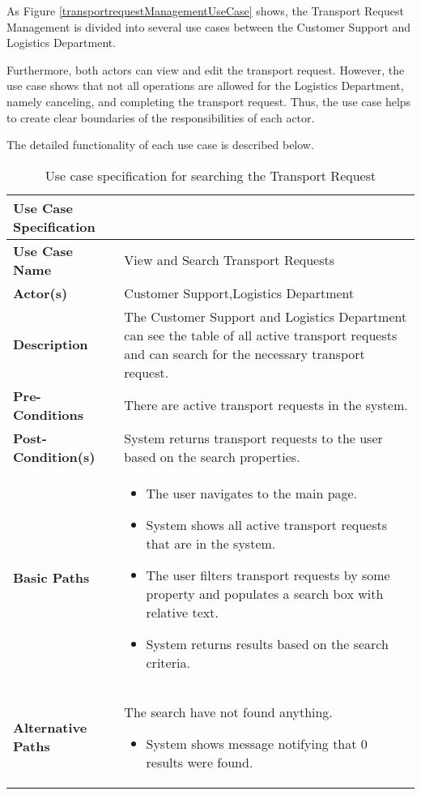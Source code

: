 \documentclass[a4paper]{article}
\begin{document}
    As Figure \ref{transportrequestManagementUseCase} shows, the Transport Request Management is divided into several use cases between the Customer Support and Logistics Department. 
    
    Furthermore, both actors can view and edit the transport request. However, the use case shows that not all operations are allowed for the Logistics Department, namely canceling, and completing the transport request. Thus, the use case helps to create clear boundaries of the responsibilities of each actor.
 
    The detailed functionality of each use case is described below.

    \begin{longtable}{|p{}|p{}|}
          \caption{Use case specification for searching the Transport Request}
        \label{transportRequestSearchingUseCase} \\
        \hline
        Use Case Specification  &  \\
         \hline
         \endhead
         \textbf{Use Case Name} & View and Search Transport Requests \\
         \hline
         \textbf{Actor(s)} & Customer Support,Logistics Department \\
         \hline
         \textbf{Description} & The Customer Support and Logistics Department can see the table of all active transport requests and can search for the necessary transport request.   \\
         \hline
         \textbf{Pre-Conditions} & There are active transport requests in the system. \\
         \hline
        \textbf{Post-Condition(s)} & System returns transport requests to the user based on the search properties. \\
         \hline
         \textbf{Basic Paths} & 
         \begin{itemize}
             \item The user navigates to the main page.
             \item System shows all active transport requests that are in the system.
             \item The user filters transport requests by some property and populates a search box with relative text.
             \item System returns results based on the search criteria.

         \end{itemize} \\
         
      \hline
      
    \textbf{Alternative Paths} & The search have not found anything.
        \begin{itemize}
            \item System shows message notifying that 0 results were found.
        \end{itemize} \\
        \hline
    \end{longtable}
    
\end{document}
